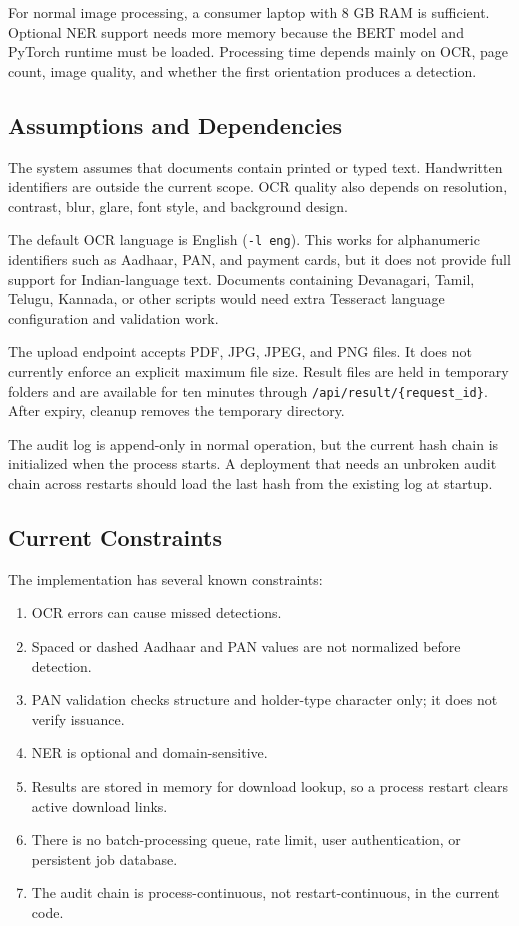For normal image processing, a consumer laptop with 8 GB RAM is sufficient. Optional NER support needs more memory because the BERT model and PyTorch runtime must be loaded. Processing time depends mainly on OCR, page count, image quality, and whether the first orientation produces a detection.

\subsection{Assumptions and Dependencies}

The system assumes that documents contain printed or typed text. Handwritten identifiers are outside the current scope. OCR quality also depends on resolution, contrast, blur, glare, font style, and background design.

The default OCR language is English (\texttt{-l eng}). This works for alphanumeric identifiers such as Aadhaar, PAN, and payment cards, but it does not provide full support for Indian-language text. Documents containing Devanagari, Tamil, Telugu, Kannada, or other scripts would need extra Tesseract language configuration and validation work.

The upload endpoint accepts PDF, JPG, JPEG, and PNG files. It does not currently enforce an explicit maximum file size. Result files are held in temporary folders and are available for ten minutes through \texttt{/api/result/\{request\_id\}}. After expiry, cleanup removes the temporary directory.

The audit log is append-only in normal operation, but the current hash chain is initialized when the process starts. A deployment that needs an unbroken audit chain across restarts should load the last hash from the existing log at startup.

\subsection{Current Constraints}

The implementation has several known constraints:

\begin{enumerate}
    \item OCR errors can cause missed detections.
    \item Spaced or dashed Aadhaar and PAN values are not normalized before detection.
    \item PAN validation checks structure and holder-type character only; it does not verify issuance.
    \item NER is optional and domain-sensitive.
    \item Results are stored in memory for download lookup, so a process restart clears active download links.
    \item There is no batch-processing queue, rate limit, user authentication, or persistent job database.
    \item The audit chain is process-continuous, not restart-continuous, in the current code.
\end{enumerate}

